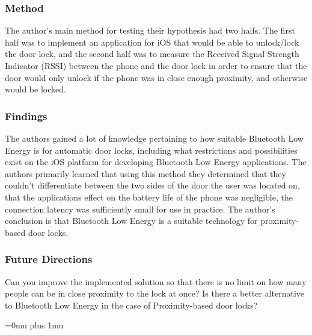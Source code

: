 \subsubsection{Method}

\noindent
The author’s main method for testing their hypothesis had two halfs. The first half was to implement an application for iOS that would be able to unlock/lock the door lock, and the second half was to measure the Received Signal Strength Indicator (RSSI) between the phone and the door lock in order to ensure that the door would only unlock if the phone was in close enough proximity, and otherwise would be locked.

\subsubsection{Findings}

\noindent
The authors gained a lot of knowledge pertaining to how suitable Bluetooth Low Energy is for automatic door locks, including what restrictions and possibilities exist on the iOS platform for developing Bluetooth Low Energy applications. The authors primarily learned that using this method they determined that they couldn’t differentiate between the two sides of the door the user was located on, that the applications effect on the battery life of the phone was negligible, the connection latency was sufficiently small for use in practice. The author's conclusion is that Bluetooth Low Energy is a suitable technology for proximity-based door locks.


\subsubsection{Future Directions}

\noindent
Can you improve the implemented solution so that there is no limit on how many people can be in close proximity to the lock at once? Is there a better alternative to Bluetooth Low Energy in the case of Proximity-based door locks?


\Urlmuskip=0mu plus 1mu\relax

\pagebreak